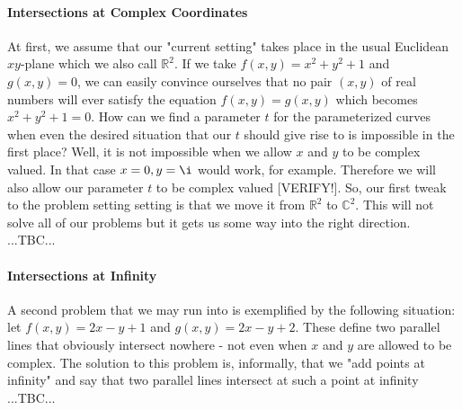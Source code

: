 
\paragraph{Intersections at Complex Coordinates}
At first, we assume that our "current setting" takes place in the usual Euclidean $xy$-plane which we also call $\mathbb{R}^2$. If we take $f(x,y) = x^2 + y^2 + 1$ and $g(x,y) = 0$, we can easily convince ourselves that no pair $(x,y)$ of real numbers will ever satisfy the equation $f(x,y) = g(x,y)$ which becomes $x^2 + y^2 + 1 = 0$. How can we find a parameter $t$ for the parameterized curves when even the desired situation that our $t$ should give rise to is impossible in the first place? Well, it is not impossible when we allow $x$ and $y$ to be complex valued. In that case $x = 0, y = \i$ would work, for example. Therefore we will also allow our parameter $t$ to be complex valued [VERIFY!]. So, our first tweak to the problem setting setting is that we move it from $\mathbb{R}^2$ to $\mathbb{C}^2$. This will not solve all of our problems but it gets us some way into the right direction. ...TBC...


\paragraph{Intersections at Infinity}
A second problem that we may run into is exemplified by the following situation: let $f(x,y) = 2 x - y + 1$ and $g(x,y) = 2 x - y + 2$. These define two parallel lines that obviously intersect nowhere - not even when $x$ and $y$ are allowed to be complex. The solution to this problem is, informally, that we "add points at infinity" and say that two parallel lines intersect at such a point at infinity ...TBC...




